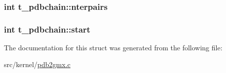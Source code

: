 \hypertarget{structt__pdbchain_ae5a92c7963e9a55dad9108b62d430739}{
\subsubsection[{nterpairs}]{\setlength{\rightskip}{0pt plus 5cm}int {\bf t\-\_\-pdbchain\-::nterpairs}}}\label{structt__pdbchain_ae5a92c7963e9a55dad9108b62d430739}
\hypertarget{structt__pdbchain_adbee6a4c32a18995ac95e9778f9437e4}{
\subsubsection[{start}]{\setlength{\rightskip}{0pt plus 5cm}int {\bf t\-\_\-pdbchain\-::start}}}\label{structt__pdbchain_adbee6a4c32a18995ac95e9778f9437e4}


\-The documentation for this struct was generated from the following file\-:\begin{DoxyCompactItemize}
\item 
src/kernel/\hyperlink{pdb2gmx_8c}{pdb2gmx.\-c}\end{DoxyCompactItemize}
